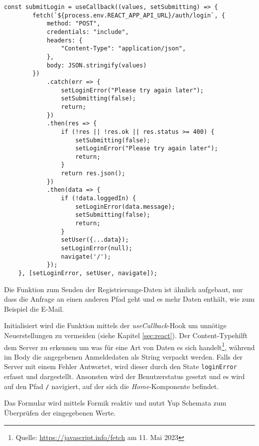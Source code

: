 \begin{lstlisting}[style=codeStyle, caption={Die Funktion zum Senden der Benutzerdaten an das Backend}, label={lst:submitLogin}]
    const submitLogin = useCallback((values, setSubmitting) => {
        fetch(`${process.env.REACT_APP_API_URL}/auth/login`, {
            method: "POST",
            credentials: "include",
            headers: {
                "Content-Type": "application/json",
            },
            body: JSON.stringify(values)
        })
            .catch(err => {
                setLoginError("Please try again later");
                setSubmitting(false);
                return;
            })
            .then(res => {
                if (!res || !res.ok || res.status >= 400) {
                    setSubmitting(false);
                    setLoginError("Please try again later");
                    return;
                }
                return res.json();
            })
            .then(data => {
                if (!data.loggedIn) {
                    setLoginError(data.message);
                    setSubmitting(false);
                    return;
                }
                setUser({...data});
                setLoginError(null);
                navigate('/');
            });
    }, [setLoginError, setUser, navigate]);
\end{lstlisting}

Die Funktion zum Senden der Registrierungs-Daten ist ähnlich aufgebaut, nur dass die Anfrage an einen anderen Pfad geht und es mehr Daten enthält, wie zum Beispiel die E-Mail.

Initialisiert wird die Funktion mittels der \textit{useCallback}-Hook um unnötige Neuerstellungen zu vermeiden (siehe Kapitel \ref{sec:react}). Der \glqq Content-Type\grqq{ }hilft dem Server zu erkennen um was für eine Art von Daten es sich handelt\footnote{Quelle: \url{https://javascript.info/fetch} am 11. Mai 2023}, während im Body die angegebenen Anmeldedaten als String verpackt werden. Falls der Server mit einem Fehler Antwortet, wird dieser durch den State \verb|loginError| erfasst und dargestellt. Ansonsten wird der Benutzerstatus gesetzt und es wird auf den Pfad \verb|/| navigiert, auf der sich die \textit{Home}-Komponente befindet.

Das Formular wird mittels Formik reaktiv und nutzt Yup Schemata zum Überprüfen der eingegebenen Werte.

